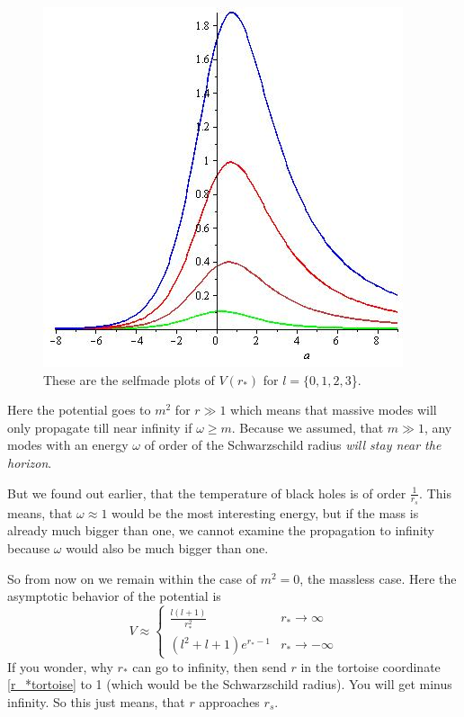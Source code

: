 	\begin{figure} [tbp]
			\begin{center}
				\includegraphics[scale=0.5]{plots_of_V}
				\caption{These are the selfmade plots of $V(r_*)$ for $l=\{0,1,2,3$\}.} \label{plots_of_V}
			\end{center}
	\end{figure} %
	Here the potential goes to $m^2$ for $r \gg 1$ which means that massive modes will only propagate till near infinity if $\omega \geq m$. Because we assumed, that $m \gg 1$, any modes with an energy $\omega$ of order of the Schwarzschild radius \textit{will stay near the horizon}. 
	 
	But we found out earlier, that the temperature of black holes is of order $\frac{1}{r_s}$. This means, that $\omega \approx 1$ would be the most interesting energy, but if the mass is already much bigger than one, we cannot examine the propagation to infinity because $\omega$ would also be much bigger than one.
		
	So from now on we remain within the case of $m^2=0$, the massless case.
	Here the asymptotic behavior of the potential is
		\begin{equation} \label{potential_near_infinity}
			V\approx
			\begin{cases}
				\frac{l(l+1)}{r^2_*} &r_* \rightarrow \infty \\
				(l^2 + l + 1) e^{r_*-1} &r_* \rightarrow - \infty
			\end{cases}
		\end{equation}
	If you wonder, why $r_*$ can go to infinity, then send $r$ in the tortoise coordinate \eqref{r_*tortoise} to 1 (which would be the Schwarzschild radius). You will get minus infinity. So this just means, that $r$ approaches $r_s$. 
	
